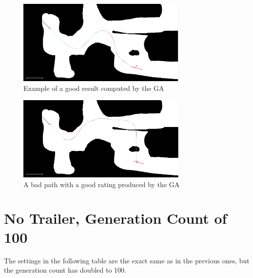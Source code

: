 \begin{figure}[h]
\centering
\includegraphics[width=0.75\textwidth]{./Chapters/Figures/example_good_path.png}
\caption{Example of a good result computed by the GA\label{pic:example_good_path}}
\end{figure}

\begin{figure}[h]
\centering
\includegraphics[width=0.75\textwidth]{./Chapters/Figures/example_problem_path.png}
\caption{A bad path with a good rating produced by the GA\label{pic:example_problem_path}}
\end{figure}

\section{No Trailer, Generation Count of 100}
\label{sec:no_trailer_100}

The settings in the following table are the exact same as in the previous ones, but the generation count has doubled to 100.

